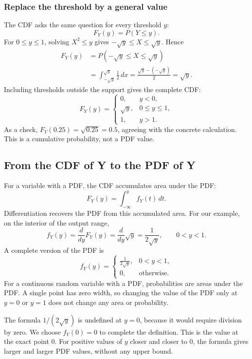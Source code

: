 \documentclass[a4paper,12pt,oneside]{report}
\begin{document}
\subsubsection{Replace the threshold by a general value}
The CDF asks the same question for every threshold $y$:
\[
  F_Y(y)=P(Y\leq y).
\]
For $0\leq y\leq1$, solving $X^2\leq y$ gives
$-\sqrt y\leq X\leq\sqrt y$. Hence
\begin{align*}
  F_Y(y)
    &=P(-\sqrt y\leq X\leq\sqrt y)\\
    &=\int_{-\sqrt y}^{\sqrt y}\frac12\,dx
      =\frac{\sqrt y-(-\sqrt y)}{2}=\sqrt y.
\end{align*}
Including thresholds outside the support gives the complete CDF:
\[
  F_Y(y)=
  \begin{cases}
    0, & y<0,\\
    \sqrt y, & 0\leq y\leq1,\\
    1, & y>1.
  \end{cases}
\]
As a check, $F_Y(0.25)=\sqrt{0.25}=0.5$, agreeing with the
concrete calculation. This is a cumulative probability, not a
PDF value.

\clearpage
\subsection{From the CDF of Y to the PDF of Y}
\label{sec:square-uniform-pdf}

For a variable with a PDF, the CDF accumulates area under
the PDF:
\[
  F_Y(y)=\int_{-\infty}^{y}f_Y(t)\,dt.
\]
Differentiation recovers the PDF from this accumulated area.
For our example, on the interior of the output range,
\[
  f_Y(y)=\frac{d}{dy}F_Y(y)
    =\frac{d}{dy}\sqrt y=\frac{1}{2\sqrt y},
  \qquad 0<y<1.
\]
A complete version of the PDF is
\[
  f_Y(y)=
  \begin{cases}
    \displaystyle\frac{1}{2\sqrt y}, & 0<y<1,\\[5pt]
    0, & \text{otherwise}.
  \end{cases}
\]
For a continuous random variable with a PDF, probabilities are
areas under the PDF. A single point has zero width, so changing
the value of the PDF only at $y=0$ or $y=1$ does not change any
area or probability.

The formula $1/(2\sqrt y)$ is undefined at $y=0$, because it would
require division by zero. We choose $f_Y(0)=0$ to complete the
definition. This is the value at the exact point $0$. For positive
values of $y$ closer and closer to $0$, the formula gives larger
and larger PDF values, without any upper bound.
\end{document}
